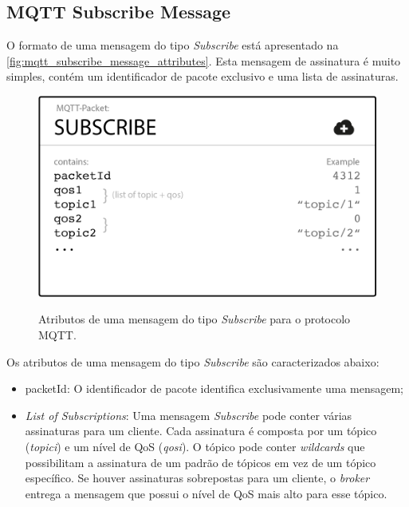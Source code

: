 \subsection{MQTT Subscribe Message}\label{subsection:mqtt_subscribe_message}

O formato de uma mensagem do tipo \textit{Subscribe} está apresentado na \autoref{fig:mqtt_subscribe_message_attributes}. Esta mensagem de assinatura é muito simples, contém um identificador de pacote exclusivo e uma lista de assinaturas.

\begin{figure}[htbp]
	\centering
	\caption{Atributos de uma mensagem do tipo \textit{Subscribe} para o protocolo MQTT.}
	\includegraphics[scale=0.5]{Imagens/mqtt_subscribe_message_attributes.png}
	\label{fig:mqtt_subscribe_message_attributes}
\end{figure}

Os atributos de uma mensagem do tipo \textit{Subscribe} são caracterizados abaixo:

\begin{itemize}
	\item packetId: O identificador de pacote identifica exclusivamente uma mensagem;
	\item \textit{List of Subscriptions}: Uma mensagem \textit{Subscribe} pode conter várias assinaturas para um cliente. Cada assinatura é composta por um tópico (\textit{topici}) e um nível de QoS (\textit{qosi}). O tópico pode conter \textit{wildcards} que possibilitam a assinatura de um padrão de tópicos em vez de um tópico específico. Se houver assinaturas sobrepostas para um cliente, o \textit{broker} entrega a mensagem que possui o nível de QoS mais alto para esse tópico.
\end{itemize}

